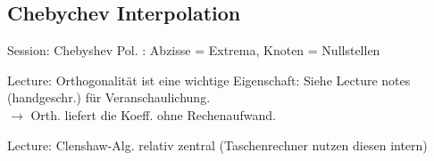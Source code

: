 \subsection{Chebychev Interpolation}

Session: Chebyshev Pol. : Abzisse = Extrema, Knoten = Nullstellen

Lecture: Orthogonalität ist eine wichtige Eigenschaft: Siehe Lecture notes (handgeschr.) für Veranschaulichung. \\
$\rightarrow$ Orth. liefert die Koeff. ohne Rechenaufwand.

Lecture: Clenshaw-Alg. relativ zentral (Taschenrechner nutzen diesen intern)
